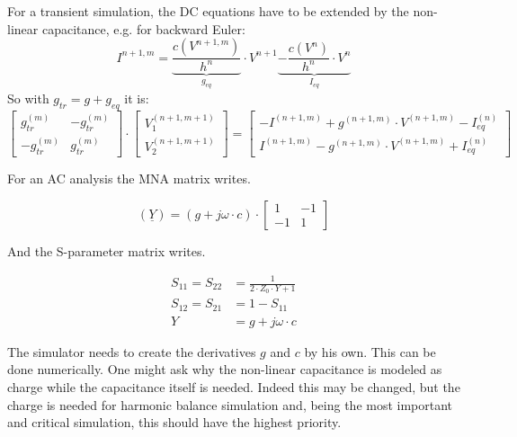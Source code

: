 For a transient simulation, the DC equations have to be extended
by the non-linear capacitance, e.g. for backward Euler:
\begin{equation}
I^{n+1,m} = \underbrace{\dfrac{c(V^{n+1,m})}{h^n}}_{g_{eq}}\cdot V^{n+1}
            \underbrace{- \dfrac{c(V^{n})}{h^n}\cdot V^{n}}_{I_{eq}}
\end{equation}
So with $g_{tr} = g + g_{eq}$ it is:
\begin{equation}
\begin{bmatrix}
 g_{tr}^{(m)} & -g_{tr}^{(m)}\\
-g_{tr}^{(m)} &  g_{tr}^{(m)}
\end{bmatrix}
\cdot
\begin{bmatrix}
V_{1}^{(n+1,m+1)}\\
V_{2}^{(n+1,m+1)}
\end{bmatrix}
=
\begin{bmatrix}
-I^{(n+1,m)} + g^{(n+1,m)}\cdot V^{(n+1,m)} - I_{eq}^{(n)}\\
 I^{(n+1,m)} - g^{(n+1,m)}\cdot V^{(n+1,m)} + I_{eq}^{(n)}
\end{bmatrix}
\end{equation}

For an AC analysis the MNA matrix writes.

\begin{equation}
(\underline{Y}) = (g + j\omega\cdot c)\cdot
\begin{bmatrix}
 1 & -1\\
-1 &  1
\end{bmatrix}
\end{equation}

And the S-parameter matrix writes.

\begin{align}
S_{11} = S_{22} &= \frac{1}{2\cdot Z_0\cdot Y + 1} \\
S_{12} = S_{21} &= 1-S_{11} \\
Y &= g + j\omega\cdot c
\end{align}

The simulator needs to create the derivatives $g$ and $c$ by his
own. This can be done numerically. One might ask why the non-linear
capacitance is modeled as charge while the capacitance itself is
needed. Indeed this may be changed, but the charge is needed for
harmonic balance simulation and, being the most important and critical
simulation, this should have the highest priority.

\addvspace{12pt}

